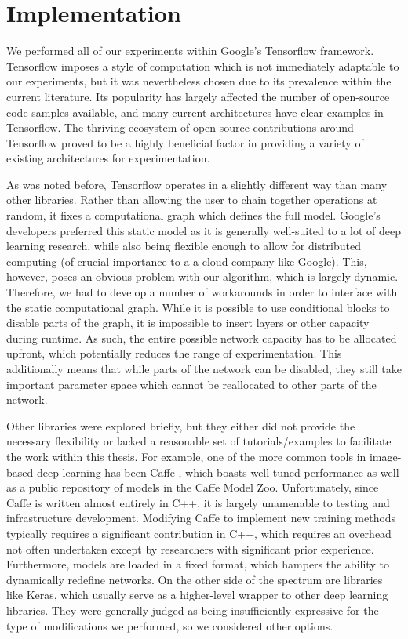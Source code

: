 \section{Implementation}
We performed all of our experiments within Google's Tensorflow \cite{abadi2016tensorflow} framework.
Tensorflow imposes a style of computation which is not immediately adaptable to our experiments, but it was nevertheless chosen due to its prevalence within the current literature. 
Its popularity has largely affected the number of open-source code samples available, and many current architectures have clear examples in Tensorflow.
The thriving ecosystem of open-source contributions around Tensorflow proved to be a highly beneficial factor in providing a variety of existing architectures for experimentation.

As was noted before, Tensorflow operates in a slightly different way than many other libraries.
Rather than allowing the user to chain together operations at random, it fixes a computational graph which defines the full model.
Google's developers preferred this static model as it is generally well-suited to a lot of deep learning research, while also being flexible enough to allow for distributed computing (of crucial importance to a a cloud company like Google).
This, however, poses an obvious problem with our algorithm, which is largely dynamic.
Therefore, we had to develop a number of workarounds in order to interface with the static computational graph.
While it is possible to use conditional blocks to disable parts of the graph, it is impossible to insert layers or other capacity during runtime.
As such, the entire possible network capacity has to be allocated upfront, which potentially reduces the range of experimentation.
This additionally means that while parts of the network can be disabled, they still take important parameter space which cannot be reallocated to other parts of the network.

Other libraries were explored briefly, but they either did not provide the necessary flexibility or lacked a reasonable set of tutorials/examples to facilitate the work within this thesis.
For example, one of the more common tools in image-based deep learning has been Caffe \cite{jia2014caffe}, which boasts well-tuned performance as well as a public repository of models in the Caffe Model Zoo.
Unfortunately, since Caffe is written almost entirely in C++, it is largely unamenable to testing and infrastructure development.
Modifying Caffe to implement new training methods typically requires a significant contribution in C++, which requires an overhead not often undertaken except by researchers with significant prior experience.
Furthermore, models are loaded in a fixed format, which hampers the ability to dynamically redefine networks.
On the other side of the spectrum are libraries like Keras, which usually serve as a higher-level wrapper to other deep learning libraries.
They were generally judged as being insufficiently expressive for the type of modifications we performed, so we considered other options.


